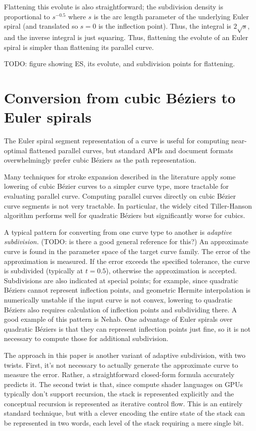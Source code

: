 \documentclass[format=acmsmall]{acmart}
\begin{document}
Flattening this evolute is also straightforward; the subdivision density is proportional to $s^{-0.5}$ where $s$ is the arc length parameter of the underlying Euler spiral (and translated so $s = 0$ is the inflection point). Thus, the integral is $2\sqrt{s}$, and the inverse integral is just squaring. Thus, flattening the evolute of an Euler spiral is simpler than flattening its parallel curve.

TODO: figure showing ES, its evolute, and subdivision points for flattening.

\section{Conversion from cubic Béziers to Euler spirals}

The Euler spiral segment representation of a curve is useful for computing near-optimal flattened parallel curves, but standard APIs and document formats overwhelmingly prefer cubic Béziers as the path representation.

Many techniques for stroke expansion described in the literature apply some lowering of cubic Bézier curves to a simpler curve type, more tractable for evaluating parallel curve. Computing parallel curves directly on cubic Bézier curve segments is not very tractable. In particular, the widely cited Tiller-Hanson algorithm\cite{Tiller1984} performs well for quadratic Béziers but significantly worse for cubics.

A typical pattern for converting from one curve type to another is \emph{adaptive subdivision.} (TODO: is there a good general reference for this?) An approximate curve is found in the parameter space of the target curve family. The error of the approximation is measured. If the error exceeds the specified tolerance, the curve is subdivided (typically at $t = 0.5$), otherwise the approximation is accepted. Subdivisions are also indicated at special points; for example, since quadratic Béziers cannot represent inflection points, and geometric Hermite interpolation is numerically unstable if the input curve is not convex, lowering to quadratic Béziers also requires calculation of inflection points and subdividing there. A good example of this pattern is Nehab\cite{Nehab2020}. One advantage of Euler spirals over quadratic Béziers is that they can represent inflection points just fine, so it is not necessary to compute those for additional subdivision.

The approach in this paper is another variant of adaptive subdivision, with two twists. First, it's not necessary to actually generate the approximate curve to measure the error. Rather, a straightforward closed-form formula accurately predicts it. The second twist is that, since compute shader languages on GPUs typically don't support recursion, the stack is represented explicitly and the conceptual recursion is represented as iterative control flow. This is an entirely standard technique, but with a clever encoding the entire state of the stack can be represented in two words, each level of the stack requiring a mere single bit.
\end{document}

